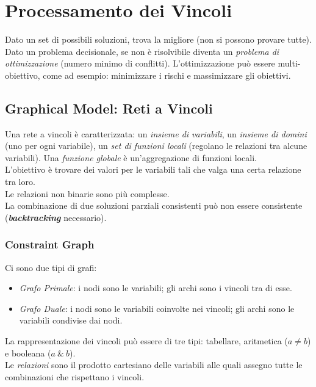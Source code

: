 \documentclass[a4paper, notitlepage, 9pt]{extreport}
\begin{document}
\chapter*{Processamento dei Vincoli}
Dato un set di possibili soluzioni, trova la migliore (non si possono provare tutte).\\
Dato un problema decisionale, se non è risolvibile diventa un \textit{problema di ottimizzazione} (numero minimo di conflitti).
L'ottimizzazione può essere multi-obiettivo, come ad esempio: minimizzare i rischi e massimizzare gli obiettivi.


\section*{Graphical Model: Reti a Vincoli}
Una rete a vincoli è caratterizzata: un \textit{insieme di variabili}, un \textit{insieme di domini} (uno per ogni variabile), un \textit{set di funzioni locali} (regolano le relazioni tra alcune variabili). Una \textit{funzione globale} è un'aggregazione di funzioni locali.\\
L'obiettivo è trovare dei valori per le variabili tali che valga una certa relazione tra loro.\\
Le relazioni non binarie sono più complesse.\\
La combinazione di due soluzioni parziali consistenti può non essere consistente (\textit{\textbf{backtracking}} necessario).

\subsection*{Constraint Graph}
Ci sono due tipi di grafi:
\begin{itemize}
	\item \textit{Grafo Primale}: i nodi sono le variabili; gli archi sono i vincoli tra di esse.
	\item \textit{Grafo Duale}: i nodi sono le variabili coinvolte nei vincoli; gli archi sono le variabili condivise dai nodi.
\end{itemize}
La rappresentazione dei vincoli può essere di tre tipi: tabellare, aritmetica ($a\neq b$) e booleana ($a ~\&~ b$).\\
Le \textit{relazioni} sono il prodotto cartesiano delle variabili alle quali assegno tutte le combinazioni che rispettano i vincoli.
\end{document}
